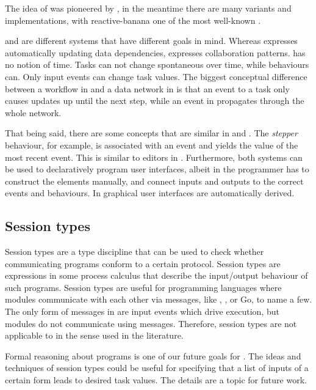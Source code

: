 The idea of \FRP was pioneered by \citet{conf/icfp/ElliottH97}, in the meantime there are many variants and implementations, with reactive-banana one of the most well-known \cite{reactive-banana}.

\FRP and \TOP are different systems that have different goals in mind.
Whereas \FRP expresses automatically updating data dependencies, \TOP expresses collaboration patterns.
\TOP has no notion of time.
Tasks can not change spontaneous over time, while behaviours can.
Only input events can change task values.
The biggest conceptual difference between a workflow in \TOP and a data network in \FRP is that an event to a task only causes updates up until the next step, while an event in \FRP propagates through the whole network.

That being said, there are some concepts that are similar in \TOP and \FRP.
The \emph{stepper} behaviour, for example, is associated with an event and yields the value of the most recent event.
This is similar to editors in \TOP.
Furthermore, both systems can be used to declaratively program user interfaces, albeit in \FRP the programmer has to construct the \GUI elements manually, and connect inputs and outputs to the correct events and behaviours.
In \TOP graphical user interfaces are automatically derived.


\subsection{Session types}

Session types are a type discipline that can be used to check whether communicating programs conform to a certain protocol.
Session types are expressions in some process calculus that describe the input/output behaviour of such programs.
Session types are useful for programming languages where modules communicate with each other via messages, like \CSP, \PICALC, or Go, to name a few.
The only form of messages in \TOP are input events which drive execution, but modules do not communicate using messages.
Therefore, session types are not applicable to \TOP in the sense used in the literature.

Formal reasoning about \TOP programs is one of our future goals for \TOPHAT.
The ideas and techniques of session types could be useful for specifying that a list of inputs of a certain form leads to desired task values.
The details are a topic for future work.
